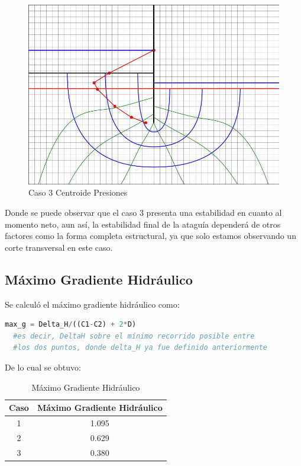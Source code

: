 \begin{figure}[H]
\begin{minipage}{0.32\textwidth}
      \includegraphics[width=\textwidth]{FOTOS/caso_3_centroide_y.jpg}
      \caption{Caso 3 Centroide Presiones}
  \end{minipage}
\end{figure}

Donde se puede observar que el caso 3 presenta una estabilidad en cuanto al momento neto, aun así, la estabilidad final de la ataguía dependerá de otros factores como la forma completa estructural, ya que solo estamos observando un corte transversal en este caso.

\subsection{Máximo Gradiente Hidráulico}

Se calculó el máximo gradiente hidráulico como:

\begin{lstlisting}[language=Python]
  max_g = Delta_H/((C1-C2) + 2*D)
  #es decir, DeltaH sobre el mínimo recorrido posible entre 
  #los dos puntos, donde delta_H ya fue definido anteriormente
\end{lstlisting}

De lo cual se obtuvo:

\begin{table}[H]
  \centering
  \begin{tabular}{|c|c|}
    \hline
    Caso & Máximo Gradiente Hidráulico \\
    \hline
    1 & 1.095 \\ \hline
    2 & 0.629 \\ \hline
    3 & 0.380 \\
    \hline
  \end{tabular}
  \caption{Máximo Gradiente Hidráulico}
\end{table}

